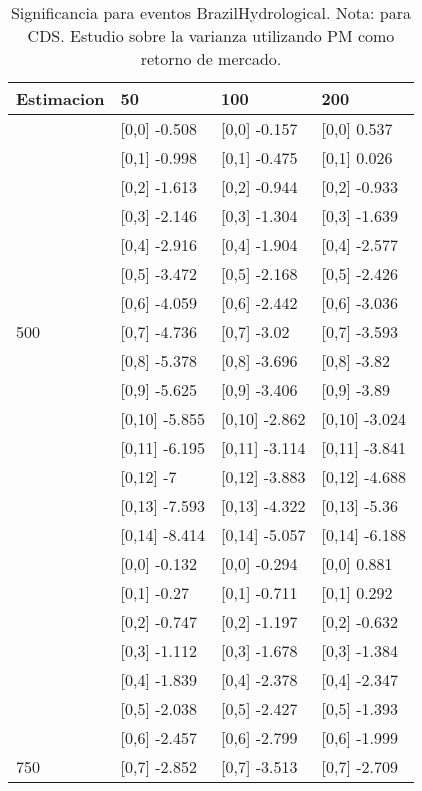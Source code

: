 \begin{table}

\caption{Significancia para eventos BrazilHydrological. Nota: para CDS. Estudio sobre la varianza utilizando PM como retorno de mercado.}
\centering
\begin{tabular}[t]{llll}
\toprule
Estimacion & 50 & 100 & 200\\
\midrule
 & {}[0,0] -0.508 & {}[0,0] -0.157 & {}[0,0] 0.537\\
 & {}[0,1] -0.998 & {}[0,1] -0.475 & {}[0,1] 0.026\\
 & {}[0,2] -1.613 & {}[0,2] -0.944 & {}[0,2] -0.933\\
 & {}[0,3] -2.146 & {}[0,3] -1.304 & {}[0,3] -1.639\\
 & {}[0,4] -2.916 & {}[0,4] -1.904 & {}[0,4] -2.577\\
\addlinespace
 & {}[0,5] -3.472 & {}[0,5] -2.168 & {}[0,5] -2.426\\
 & {}[0,6] -4.059 & {}[0,6] -2.442 & {}[0,6] -3.036\\
500 & {}[0,7] -4.736 & {}[0,7] -3.02 & {}[0,7] -3.593\\
 & {}[0,8] -5.378 & {}[0,8] -3.696 & {}[0,8] -3.82\\
 & {}[0,9] -5.625 & {}[0,9] -3.406 & {}[0,9] -3.89\\
\addlinespace
 & {}[0,10] -5.855 & {}[0,10] -2.862 & {}[0,10] -3.024\\
 & {}[0,11] -6.195 & {}[0,11] -3.114 & {}[0,11] -3.841\\
 & {}[0,12] -7 & {}[0,12] -3.883 & {}[0,12] -4.688\\
 & {}[0,13] -7.593 & {}[0,13] -4.322 & {}[0,13] -5.36\\
 & {}[0,14] -8.414 & {}[0,14] -5.057 & {}[0,14] -6.188\\
\addlinespace
 & {}[0,0] -0.132 & {}[0,0] -0.294 & {}[0,0] 0.881\\
 & {}[0,1] -0.27 & {}[0,1] -0.711 & {}[0,1] 0.292\\
 & {}[0,2] -0.747 & {}[0,2] -1.197 & {}[0,2] -0.632\\
 & {}[0,3] -1.112 & {}[0,3] -1.678 & {}[0,3] -1.384\\
 & {}[0,4] -1.839 & {}[0,4] -2.378 & {}[0,4] -2.347\\
\addlinespace
 & {}[0,5] -2.038 & {}[0,5] -2.427 & {}[0,5] -1.393\\
 & {}[0,6] -2.457 & {}[0,6] -2.799 & {}[0,6] -1.999\\
750 & {}[0,7] -2.852 & {}[0,7] -3.513 & {}[0,7] -2.709\\

\end{tabular}
\end{table}
